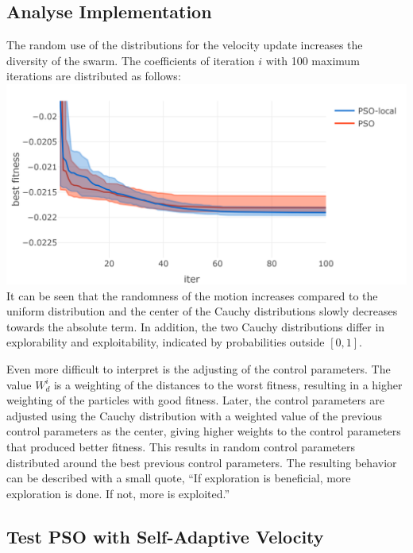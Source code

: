 \documentclass[
  oneside]{book}
\begin{document}
\hypertarget{analyse-implementation}{%
\subsection{Analyse Implementation}\label{analyse-implementation}}

The random use of the distributions for the velocity update increases the diversity of the swarm. The coefficients of iteration \(i\) with 100 maximum iterations are distributed as follows:\\
\includegraphics{Master_Thesis_files/figure-latex/unnamed-chunk-12-1.png}
It can be seen that the randomness of the motion increases compared to the uniform distribution and the center of the Cauchy distributions slowly decreases towards the absolute term. In addition, the two Cauchy distributions differ in explorability and exploitability, indicated by probabilities outside \([0, 1]\).

Even more difficult to interpret is the adjusting of the control parameters. The value \(W_d^i\) is a weighting of the distances to the worst fitness, resulting in a higher weighting of the particles with good fitness. Later, the control parameters are adjusted using the Cauchy distribution with a weighted value of the previous control parameters as the center, giving higher weights to the control parameters that produced better fitness. This results in random control parameters distributed around the best previous control parameters. The resulting behavior can be described with a small quote, ``If exploration is beneficial, more exploration is done. If not, more is exploited.''

\hypertarget{test-pso-with-self-adaptive-velocity}{%
\subsection{Test PSO with Self-Adaptive Velocity}\label{test-pso-with-self-adaptive-velocity}}
\end{document}
